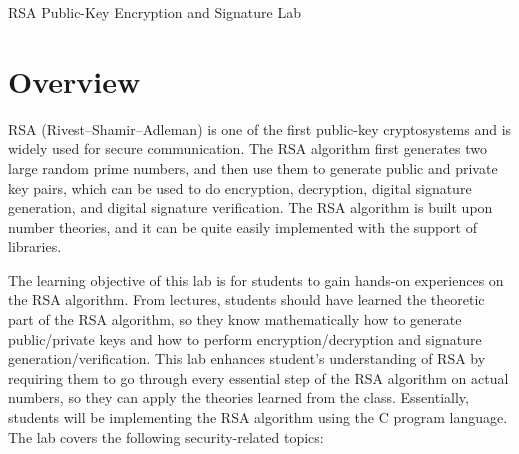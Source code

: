 
\newcommand{\commonfolder}{../../common-files}









\begin{center}
{\LARGE RSA Public-Key Encryption and Signature Lab}
\end{center}




\section{Overview}

RSA (Rivest–Shamir–Adleman) is one of the first public-key cryptosystems
and is widely used for secure communication.
The RSA algorithm first generates two large random prime numbers,
and then use them to generate public and private key pairs, which can be
used to do encryption, decryption, digital signature generation,
and digital signature verification. The RSA algorithm is built upon
number theories, and it can be quite easily implemented with the support of
libraries.


The learning objective of this lab is for students to gain hands-on experiences on
the RSA algorithm. From lectures, students should have learned the 
theoretic part of the RSA algorithm, so they know 
mathematically how to generate public/private keys and 
how to perform encryption/decryption and signature generation/verification. 
This lab enhances student's understanding of RSA 
by requiring them to go through every essential step of the RSA algorithm
on actual numbers, so they can apply the theories learned from the class.
Essentially, students will be implementing the RSA algorithm using
the C program language. The lab covers the following security-related topics:

